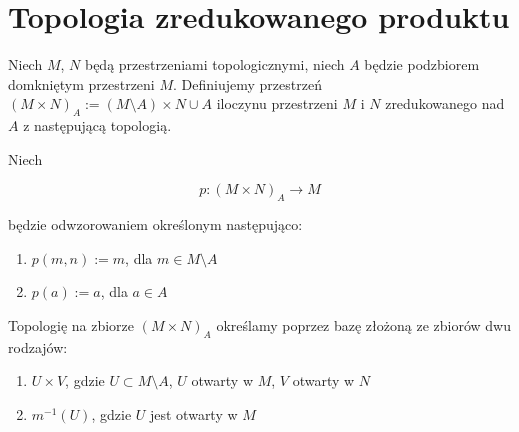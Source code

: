 \section{Topologia zredukowanego produktu}
\begin{df}
  Niech $M$, $N$ będą przestrzeniami topologicznymi, niech $A$ będzie podzbiorem domkniętym przestrzeni $M$. Definiujemy przestrzeń $(M \times N)_A := (M \setminus A) \times N \cup A$ iloczynu przestrzeni $M$ i $N$ zredukowanego nad $A$ z następującą topologią.
  
  Niech
  
  $$p: (M \times N)_A \rightarrow M$$
  
  będzie odwzorowaniem określonym następująco:
  \begin{enumerate}
   \item $p(m, n) := m$, dla $m \in M \setminus A$
   \item $p(a) := a$, dla $a \in A$
  \end{enumerate}
  
  Topologię na zbiorze $(M \times N)_A$ określamy poprzez bazę złożoną ze zbiorów dwu rodzajów:
  \begin{enumerate}
   \item $U \times V$, gdzie $U \subset M \setminus A$, $U$ otwarty w $M$, $V$ otwarty w $N$
   \item $m^{-1}(U)$, gdzie $U$ jest otwarty w $M$
  \end{enumerate}
\end{df}


